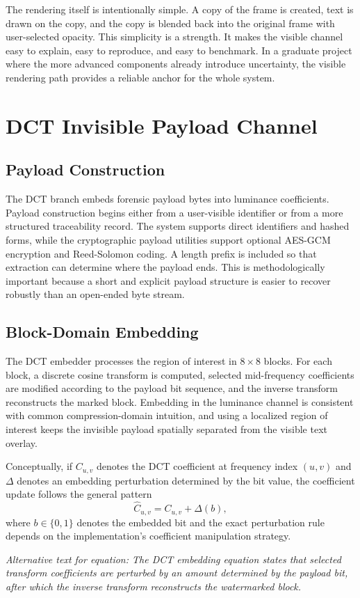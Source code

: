 \documentclass[12pt,oneside]{report}
\newcommand{\FormulaAlt}[1]{\par\small\textit{Alternative text for equation: #1}\normalsize}
\begin{document}
The rendering itself is intentionally simple. A copy of the frame is created, text is drawn on the copy, and the copy is blended back into the original frame with user-selected opacity. This simplicity is a strength. It makes the visible channel easy to explain, easy to reproduce, and easy to benchmark. In a graduate project where the more advanced components already introduce uncertainty, the visible rendering path provides a reliable anchor for the whole system.

\section{DCT Invisible Payload Channel}
\subsection{Payload Construction}
The DCT branch embeds forensic payload bytes into luminance coefficients. Payload construction begins either from a user-visible identifier or from a more structured traceability record. The system supports direct identifiers and hashed forms, while the cryptographic payload utilities support optional AES-GCM encryption and Reed-Solomon coding. A length prefix is included so that extraction can determine where the payload ends. This is methodologically important because a short and explicit payload structure is easier to recover robustly than an open-ended byte stream.

\subsection{Block-Domain Embedding}
The DCT embedder processes the region of interest in $8 \times 8$ blocks. For each block, a discrete cosine transform is computed, selected mid-frequency coefficients are modified according to the payload bit sequence, and the inverse transform reconstructs the marked block. Embedding in the luminance channel is consistent with common compression-domain intuition, and using a localized region of interest keeps the invisible payload spatially separated from the visible text overlay.

Conceptually, if $C_{u,v}$ denotes the DCT coefficient at frequency index $(u,v)$ and $\Delta$ denotes an embedding perturbation determined by the bit value, the coefficient update follows the general pattern
\begin{equation}
\hat{C}_{u,v} = C_{u,v} + \Delta(b),
\end{equation}
where $b \in \{0,1\}$ denotes the embedded bit and the exact perturbation rule depends on the implementation's coefficient manipulation strategy.
\FormulaAlt{The DCT embedding equation states that selected transform coefficients are perturbed by an amount determined by the payload bit, after which the inverse transform reconstructs the watermarked block.}
\end{document}
